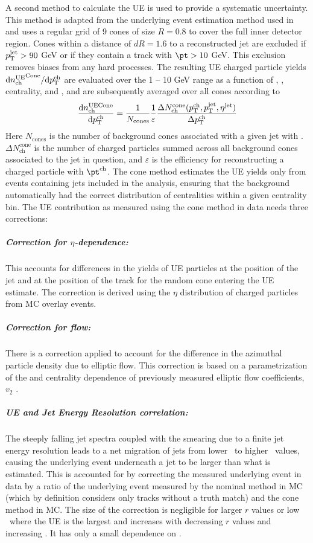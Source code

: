 A second method to calculate the UE is used to provide a systematic uncertainty. This method is adapted from the underlying event estimation method used in \cite{PhysRevC.98.024908} and uses a regular grid of 9 cones of size $R = 0.8$ to cover the full inner detector region. Cones within a distance of $dR=1.6$ to a reconstructed jet are excluded if $\mbox{$p_{\mathrm{T}}^{\mathrm{jet}}$} > 90$ GeV or if they contain a track with $\pt > 10$ GeV. This exclusion removes biases from any hard processes. The resulting UE charged particle yields $\mathrm{d} \mbox{$n_{\mathrm{ch}}^{\mathrm{UE}}$}^{\mathrm{Cone}}/ \mathrm{d} \mbox{$p_{{\mathrm{T}}}^{\mathrm{ch}}$}$ are evaluated over the 1 -- 10 GeV range as a function of \pt, \ptjet, centrality, and \rvar, and are subsequently averaged over all cones according to
 \begin{eqnarray}
 \label{eq:Dptsub}
\frac{\mathrm{d} n_{\mathrm{ch}}^{\mathrm{UE Cone}}}{\mathrm{d} \mbox{$p_{{\mathrm{T}}}^{\mathrm{ch}}$}}  = \frac{1}{N_{\mathrm{cones}}} \frac{1}{\varepsilon} \frac{\Delta N^{\mathrm{cone}}_{\mathrm{ch}} (\mbox{$p_{{\mathrm{T}}}^{\mathrm{ch}}$}, \mbox{$p_{\mathrm{T}}^{\mathrm{jet}}$}, \mbox{$\eta^{\mathrm{jet}}$})}{\Delta \mbox{$p_{{\mathrm{T}}}^{\mathrm{ch}}$}}
 \end{eqnarray}
 Here $N_{\mathrm{cones}}$ is the number of background cones associated with a given jet with \ptjet. $\Delta N^{\mathrm{cone}}_{\mathrm{ch}}$ is the number of charged particles summed across all background cones associated to the jet in question, and $\varepsilon$ is the efficiency for reconstructing a charged particle with $\pt^{\mathrm{ch}}$. The cone method estimates the UE yields only from events containing jets included in the analysis, ensuring that the background automatically had the correct distribution of centralities within a given centrality bin. The UE contribution as measured using the cone method in data needs three corrections:
 \subparagraph{Correction for $\eta$-dependence: } This accounts for differences in the yields of UE particles at the position of the jet and at the position of the track for the random cone entering the UE estimate. The correction is derived using the $\eta$ distribution of charged particles from MC overlay events.
 \subparagraph{Correction for flow: }  There is a correction applied to account for the difference in the azimuthal particle density due to elliptic flow. This correction is based on a parametrization of the \pTch and centrality dependence of previously measured elliptic flow coefficients, $v_{2}$ \cite{2019108}.  
\subparagraph{UE and Jet Energy Resolution correlation: } The steeply falling jet spectra coupled with the smearing due to a finite jet energy resolution leads to a net migration of jets from lower \pt\ to higher \pt\ values, causing the underlying event underneath a jet to be larger than what is estimated. This is accounted for by correcting the measured underlying event in data by a ratio of the underlying event measured by the nominal method in MC (which by definition considers only tracks without a truth match) and the cone method in MC. The size of the correction is negligible for larger $r$ values or low \pttrk\ where the UE is the largest and increases with decreasing $r$ values and increasing \pttrk. It has only a small dependence on \ptjet. 

